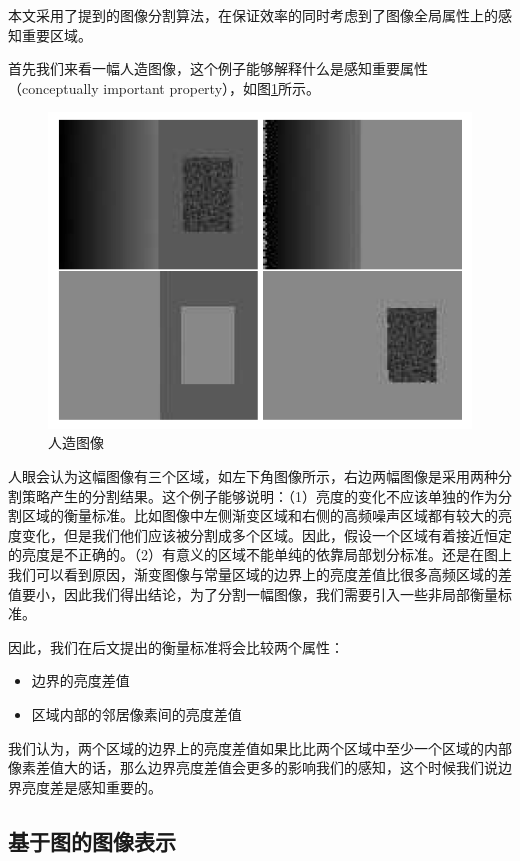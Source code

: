 本文采用了\cite{Felzenszwalb:2004il}提到的图像分割算法，在保证效率的同时考虑到了图像全局属性上的感知重要区域。

首先我们来看一幅人造图像，这个例子能够解释什么是感知重要属性（conceptually important property），如图\ref{fig:man_made}所示。
\begin{figure}
\centering\includegraphics[width=15cm]{imgs/ch2/man_made}
\caption{人造图像}
\label{fig:man_made}
\end{figure}

人眼会认为这幅图像有三个区域，如左下角图像所示，右边两幅图像是采用两种分割策略产生的分割结果。这个例子能够说明：（1）亮度的变化不应该单独的作为分割区域的衡量标准。比如图像中左侧渐变区域和右侧的高频噪声区域都有较大的亮度变化，但是我们他们应该被分割成多个区域。因此，假设一个区域有着接近恒定的亮度是不正确的。（2）有意义的区域不能单纯的依靠局部划分标准。还是在图上我们可以看到原因，渐变图像与常量区域的边界上的亮度差值比很多高频区域的差值要小，因此我们得出结论，为了分割一幅图像，我们需要引入一些非局部衡量标准。

因此，我们在后文提出的衡量标准将会比较两个属性：
\begin{itemize}
\item 边界的亮度差值
\item 区域内部的邻居像素间的亮度差值
\end{itemize}
我们认为，两个区域的边界上的亮度差值如果比比两个区域中至少一个区域的内部像素差值大的话，那么边界亮度差值会更多的影响我们的感知，这个时候我们说边界亮度差是感知重要的。

\subsection{基于图的图像表示}

